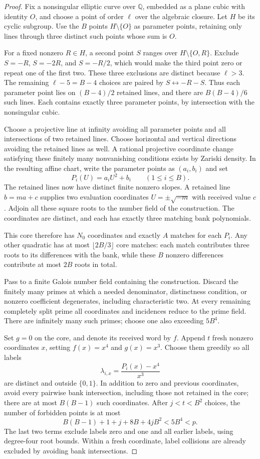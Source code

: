 \begin{proof}
Fix a nonsingular elliptic curve over $\mathbb Q$, embedded as a plane
cubic with identity $O$, and choose a point of order $\ell$ over the
algebraic closure. Let $H$ be its cyclic subgroup. Use the $B$ points
$H\setminus\{O\}$ as parameter points, retaining only lines through
three distinct such points whose sum is $O$.

For a fixed nonzero $R\in H$, a second point $S$ ranges over
$H\setminus\{O,R\}$. Exclude $S=-R$, $S=-2R$, and $S=-R/2$, which
would make the third point zero or repeat one of the first two. These
three exclusions are distinct because $\ell>3$. The remaining
$\ell-5=B-4$ choices are paired by $S\leftrightarrow-R-S$.
Thus each parameter point lies on $(B-4)/2$ retained lines, and there
are $B(B-4)/6$ such lines. Each contains exactly three parameter points,
by intersection with the nonsingular cubic.

Choose a projective line at infinity avoiding all parameter points and
all intersections of two retained lines. Choose horizontal and vertical
directions avoiding the retained lines as well. A rational projective
coordinate change satisfying these finitely many nonvanishing
conditions exists by Zariski density. In the resulting affine chart,
write the parameter points as $(a_i,b_i)$ and set
\[
 P_i(U)=a_iU^2+b_i\qquad(1\le i\le B).
\]
The retained lines now have distinct finite nonzero slopes. A retained
line $b=ma+c$ supplies two evaluation coordinates
$U=\pm\sqrt{-m}$ with received value $c$. Adjoin all these square roots
to the number field of the construction. The coordinates are distinct,
and each has exactly three matching bank polynomials.

This core therefore has $N_0$ coordinates and exactly $A$ matches for
each $P_i$. Any other quadratic has at most $\lfloor2B/3\rfloor$ core
matches: each match contributes three roots to its differences with
the bank, while these $B$ nonzero differences contribute at most $2B$
roots in total.

Pass to a finite Galois number field containing the construction.
Discard the finitely many primes at which a needed denominator,
distinctness condition, or nonzero coefficient degenerates, including
characteristic two. At every remaining completely split prime all
coordinates and incidences reduce to the prime field. There are
infinitely many such primes; choose one also exceeding $5B^4$.

Set $g=0$ on the core, and denote its received word by $f$. Append $t$
fresh nonzero coordinates $x$, setting $f(x)=x^4$ and $g(x)=x^3$.
Choose them greedily so all labels
\[
 \lambda_{i,x}=\frac{P_i(x)-x^4}{x^3}
\]
are distinct and outside $\{0,1\}$. In addition to zero and previous
coordinates, avoid every pairwise bank intersection, including those
not retained in the core; there are at most $B(B-1)$ such coordinates.
After $j<t<B^2$ choices, the number of forbidden points is at most
\[
 B(B-1)+1+j+8B+4jB^2<5B^4<p.
\]
The last two terms exclude labels zero and one and all earlier labels,
using degree-four root bounds. Within a fresh coordinate, label
collisions are already excluded by avoiding bank intersections.


\end{proof}
